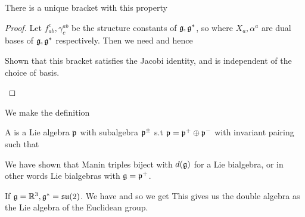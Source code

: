 \documentclass{article}
\begin{document}
\begin{prop}
There is a unique bracket with this property 
\end{prop}
\begin{proof}
Let $f^c_{ab}, \gamma^{ab}_c$ be the structure constants of $\mathfrak{g},\mathfrak{g}^\ast$, so 
 where $X_a,\alpha^a$ are dual bases of $\mathfrak{g},\mathfrak{g}^\ast$ respectively. Then we need
 and hence 
\begin{ex}
Shown that this bracket satisfies the Jacobi identity, and is independent of the choice of basis.
\end{ex}
\end{proof}
We make the definition
\begin{definition}
A  is a Lie algebra $\mathfrak{p}$ with subalgebra $\mathfrak{p}^\pm$ s.t $\mathfrak{p} = \mathfrak{p}^+ \oplus \mathfrak{p}^-$ with invariant pairing such that 
\end{definition}
We have shown that Manin triples biject with $d(\mathfrak{g})$ for a Lie bialgebra, or in other words Lie bialgebras with $\mathfrak{g} = \mathfrak{p}^+$. 

\begin{example}
If $\mathfrak{g} = \mathbb{R}^3, \mathfrak{g}^\ast = \mathfrak{su}(2)$. We have 
and so we get  
This gives us the double algebra as the Lie algebra of the Euclidean group. 
\end{example}
\end{document}
